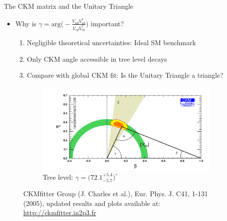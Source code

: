 \documentclass[dvipsnames]{beamer}
\begin{document}
\begin{frame}{The CKM matrix and the Unitary Triangle}
  \begin{itemize}
    \setlength\itemsep{0.5em}
    \item{Why is $\gamma = \text{arg}\Big(-\frac{V^{\phantom{*}}_{ud}V^*_{ub}}{V^{\phantom{*}}_{cd}V^*_{cb}}\Big)$ important?}
    \begin{enumerate}
    \setlength\itemsep{0.5em}
      \item{Negligible theoretical uncertainties: Ideal SM benchmark}
      \item{Only CKM angle accessible in tree level decays}
      \item{Compare with global CKM fit: Is the Unitary Triangle a triangle?}
    \end{enumerate}
  \end{itemize}
  \vspace{-0.2cm}
  \begin{figure}
    \centering
    \begin{subfigure}{0.5\textwidth}
      \centering
      \includegraphics[width = 1.0\textwidth]{Plots/ckmfitter_tree.png}
      \caption*{Tree level: \colorbox{white}{$\gamma = \big(72.1^{+5.4}_{-5.7}\big)^\circ$}}
    \end{subfigure}
    \vspace{-0.3cm}
    \captionsetup{justification=centering}
    \caption*{\centering\tiny CKMfitter Group (J. Charles et al.), Eur. Phys. J. C41, 1-131 (2005), updated results and plots available at: \href{http://ckmfitter.in2p3.fr}{http://ckmfitter.in2p3.fr}}
  \end{figure}
  \vspace{-0.7cm}
  \begin{center}
    \phantom{Need to reduce uncertainties significantly in direct measurements!}
  \end{center}
\end{frame}
\end{document}
